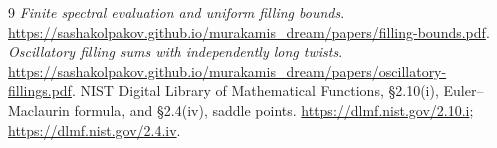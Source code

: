 \begin{thebibliography}{9}
\emph{Finite spectral evaluation and uniform filling bounds}.
\url{https://sashakolpakov.github.io/murakamis_dream/papers/filling-bounds.pdf}.
\emph{Oscillatory filling sums with independently long twists}.
\url{https://sashakolpakov.github.io/murakamis_dream/papers/oscillatory-fillings.pdf}.
NIST Digital Library of Mathematical Functions,
\S2.10(i), Euler--Maclaurin formula, and \S2.4(iv), saddle points.
\url{https://dlmf.nist.gov/2.10.i};
\url{https://dlmf.nist.gov/2.4.iv}.
\end{thebibliography}
